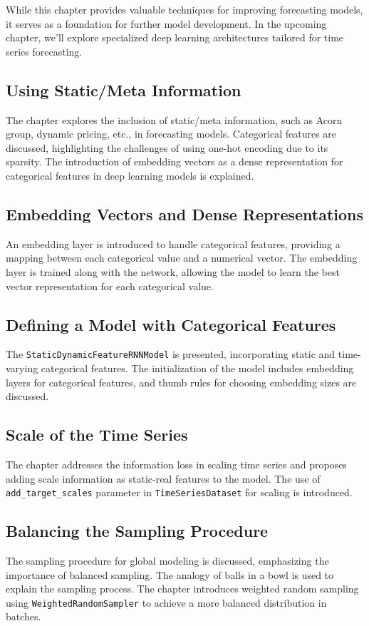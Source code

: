 \documentclass{article}
\begin{document}
While this chapter provides valuable techniques for improving forecasting models, it serves as a foundation for further model development. In the upcoming chapter, we'll explore specialized deep learning architectures tailored for time series forecasting.


\subsection{Using Static/Meta Information}
The chapter explores the inclusion of static/meta information, such as Acorn group, dynamic pricing, etc., in forecasting models. Categorical features are discussed, highlighting the challenges of using one-hot encoding due to its sparsity. The introduction of embedding vectors as a dense representation for categorical features in deep learning models is explained.

\subsection{Embedding Vectors and Dense Representations}
An embedding layer is introduced to handle categorical features, providing a mapping between each categorical value and a numerical vector. The embedding layer is trained along with the network, allowing the model to learn the best vector representation for each categorical value.

\subsection{Defining a Model with Categorical Features}
The \texttt{StaticDynamicFeatureRNNModel} is presented, incorporating static and time-varying categorical features. The initialization of the model includes embedding layers for categorical features, and thumb rules for choosing embedding sizes are discussed.

\subsection{Scale of the Time Series}
The chapter addresses the information loss in scaling time series and proposes adding scale information as static-real features to the model. The use of \texttt{add\_target\_scales} parameter in \texttt{TimeSeriesDataset} for scaling is introduced.

\subsection{Balancing the Sampling Procedure}
The sampling procedure for global modeling is discussed, emphasizing the importance of balanced sampling. The analogy of balls in a bowl is used to explain the sampling process. The chapter introduces weighted random sampling using \texttt{WeightedRandomSampler} to achieve a more balanced distribution in batches.
\end{document}
